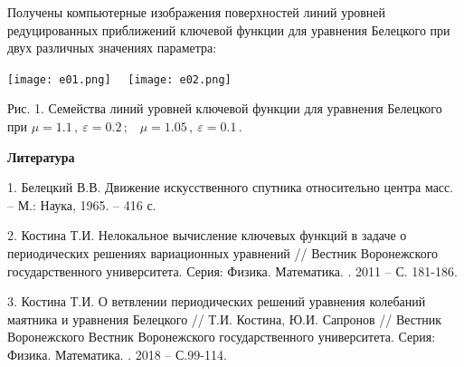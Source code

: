 Получены компьютерные изображения поверхностей линий уровней
редуцированных приближений ключевой функции для уравнения Белецкого при двух различных значениях параметра:

\begin{center}
\texttt{[image: e01.png]} \ \
\texttt{[image: e02.png]}

Рис. 1. Семейства линий уровней ключевой функции для уравнения Белецкого при {$\mu
= 1.1\,, \ \varepsilon=0.2\,;$ \ $\mu = 1.05\,, \
\varepsilon=0.1\,. $}

\end{center}






\smallskip \centerline {\bf Литература} \nopagebreak

1. Белецкий В.В. Движение искусственного спутника относительно центра масс.
-- М.: Наука, 1965. -- 416 с.


2. Костина Т.И. Нелокальное вычисление ключевых функций в задаче о
периодических решениях вариационных уравнений // Вестник
Воронежского государственного университета. Серия: Физика.
Математика. . 2011 -- С. 181-186.


3. Костина Т.И. О ветвлении периодических решений уравнения колебаний маятника и уравнения Белецкого // Т.И. Костина, Ю.И. Сапронов // Вестник Воронежского Вестник
Воронежского государственного университета. Серия: Физика.
Математика. \No 1. 2018 -- С.99-114.
